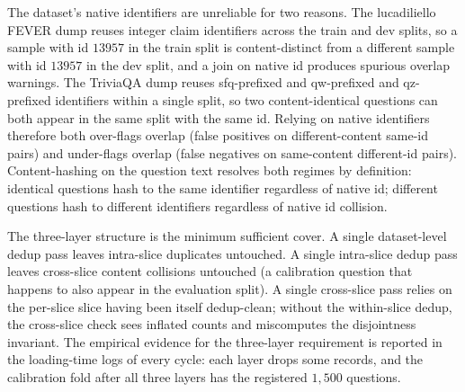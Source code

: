 The dataset's native identifiers are unreliable for two reasons. The lucadiliello FEVER dump reuses integer claim identifiers across the train and dev splits, so a sample with id $13957$ in the train split is content-distinct from a different sample with id $13957$ in the dev split, and a join on native id produces spurious overlap warnings. The TriviaQA dump reuses sfq-prefixed and qw-prefixed and qz-prefixed identifiers within a single split, so two content-identical questions can both appear in the same split with the same id. Relying on native identifiers therefore both over-flags overlap (false positives on different-content same-id pairs) and under-flags overlap (false negatives on same-content different-id pairs). Content-hashing on the question text resolves both regimes by definition: identical questions hash to the same identifier regardless of native id; different questions hash to different identifiers regardless of native id collision.

The three-layer structure is the minimum sufficient cover. A single dataset-level dedup pass leaves intra-slice duplicates untouched. A single intra-slice dedup pass leaves cross-slice content collisions untouched (a calibration question that happens to also appear in the evaluation split). A single cross-slice pass relies on the per-slice slice having been itself dedup-clean; without the within-slice dedup, the cross-slice check sees inflated counts and miscomputes the disjointness invariant. The empirical evidence for the three-layer requirement is reported in the loading-time logs of every cycle: each layer drops some records, and the calibration fold after all three layers has the registered $1{,}500$ questions.

